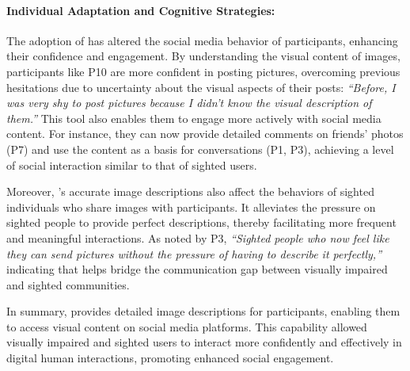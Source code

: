 \paragraph{Individual Adaptation and Cognitive Strategies:}
The adoption of \bma{} has altered the social media behavior of participants, enhancing their confidence and engagement. By understanding the visual content of images, participants like P10 are more confident in posting pictures, overcoming previous hesitations due to uncertainty about the visual aspects of their posts: \textit{``Before, I was very shy to post pictures because I didn't know the visual description of them.''} 
% 
This tool also enables them to engage more actively with social media content. For instance, they can now provide detailed comments on friends' photos (P7) and use the content as a basis for conversations (P1, P3), achieving a level of social interaction similar to that of sighted users. 




Moreover, \bma's accurate image descriptions also affect the behaviors of sighted individuals who share images with participants. It alleviates the pressure on sighted people to provide perfect descriptions, thereby facilitating more frequent and meaningful interactions. As noted by P3, \textit{``Sighted people who now feel like they can send pictures without the pressure of having to describe it perfectly,''} indicating that \bma{} helps bridge the communication gap between visually impaired and sighted communities.


In summary, \bma{} provides detailed image descriptions for participants, enabling them to access visual content on social media platforms. This capability allowed visually impaired and sighted users to interact more confidently and effectively in digital human interactions, promoting enhanced social engagement.



